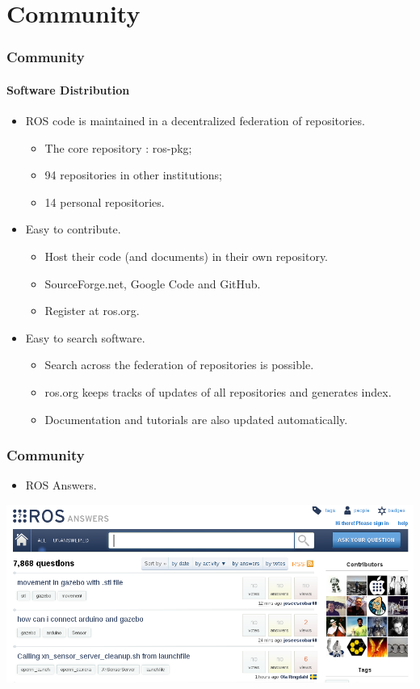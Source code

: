 \documentclass{beamer}
\begin{document}
\section{Community}
\begin{frame}
\frametitle{Community}
\framesubtitle{Software Distribution}

\begin{itemize}
  \item ROS code is maintained in a decentralized federation of repositories.
  \begin{itemize}
    \item The core repository : ros-pkg;
    \item 94 repositories in other institutions;
    \item 14 personal repositories.
  \end{itemize}
  \item Easy to contribute.
  \begin{itemize}
    \item Host their code (and documents) in their own repository.
    \item SourceForge.net, Google Code and GitHub.
    \item Register at ros.org.
  \end{itemize}
  \item Easy to search software.
  \begin{itemize}
    \item Search across the federation of repositories is possible.
    \item ros.org keeps tracks of updates of all repositories and generates index.
    \item Documentation and tutorials are also updated automatically.
  \end{itemize}
\end{itemize}

\end{frame}

\begin{frame}
\frametitle{Community}

\begin{itemize}
  \item ROS Answers.
\end{itemize}
\begin{center}
  \includegraphics[width=\textwidth]{ros_answers}
\end{center}
\end{frame}
\end{document}

